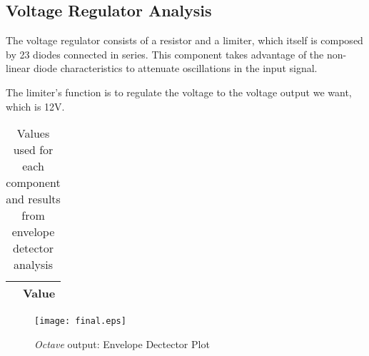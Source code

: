 \subsection{Voltage Regulator Analysis}

The voltage regulator consists of a resistor and a limiter, which itself is composed by 23 diodes connected in series. This component takes advantage of the non-linear diode characteristics to attenuate oscillations in the input signal.

The limiter’s function is to regulate the voltage to the voltage output we want, which is 12V.

\begin{table}[h]
  \centering
  \begin{tabular}{|c|c|}
    \hline    
     & { Value} \\ \hline
    
 \end{tabular}
 \caption{Values used for each component and results from envelope detector analysis}
  \label{tab:op2}
\end{table}


\begin{figure}[h]
    \centering
    \texttt{[image: final.eps]}
    \caption{{\it Octave} output: Envelope Dectector Plot}
    \label{fig:OctaveOut}
\end{figure}

